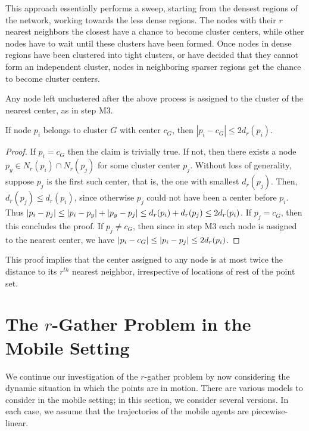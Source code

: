 This approach essentially performs a sweep, starting from the densest regions of the network, working towards the less dense regions. The nodes with their $r$ nearest neighbors the closest have a chance to become cluster centers, while other nodes have to wait until these clusters have been formed. Once nodes in dense regions have been clustered into tight clusters, or have decided that they cannot form an independent cluster, nodes in neighboring sparser regions get the chance to become cluster centers. 

Any node left unclustered after the above process is assigned to the cluster of the nearest center, as in step M3. 

\begin{theorem}
If node $p_i$ belongs to cluster $G$ with center $c_G$, then $|p_{i} - c_G|\leq 2 d_{r}(p_{i})$. 
\end{theorem}
\begin{proof}
If $p_i=c_G$ then the claim is trivially true. If not, then there exists a node $p_y \in N_{r}(p_i)\cap N_{r}(p_j)$ for some cluster center $p_j$. Without loss of generality, suppose $p_j$ is the first such center, that is, the one with smallest $d_{r}(p_j)$. Then, $d_{r}(p_j)\leq d_{r}(p_i)$, since otherwise $p_j$ could not have been a center before $p_i$. Thus $\mathopen|p_{i}-p_{j}\mathclose|\leq |p_i-p_y|+|p_y-p_j|\leq d_r(p_i)+d_r(p_j)\leq 2 d_{r}(p_i)$.
If $p_j=c_G$, then this concludes the proof. If $p_j\neq c_G$, then since in step M3 each node is assigned to the nearest center, we have $\mathopen|p_{i}-c_G\mathclose|\leq \mathopen|p_{i}-p_{j}\mathclose|\leq 2 d_{r}(p_i)$.
\end{proof}

This proof implies that the center assigned to any node is at most twice the distance to its $r^{th}$ nearest neighbor, irrespective of locations of rest of the point set. 



\section{The $r$-Gather Problem in the Mobile Setting}

We continue our investigation of the $r$-gather problem by now considering the dynamic situation in which the points are in motion. There are various models to consider in the mobile setting; in this section, we consider several versions.  In each case, we assume that the trajectories of the mobile agents are piecewise-linear.


